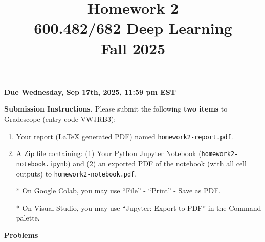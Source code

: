 \documentclass[a4paper]{article}
\title{Homework 2\\
600.482/682 Deep Learning\\
Fall 2025}
\date{}
\begin{document}
\maketitle
\vspace{-1.3cm}

\centerline{\textbf{Due Wednesday, Sep 17th, 2025, 11:59 pm EST}}
\vspace{0.2cm}

\noindent \textbf{Submission Instructions.} Please submit the following \textbf{two items} to Gradescope (entry code VWJRB3): 

\begin{enumerate}
    \item Your report (LaTeX generated PDF) named \texttt{homework2-report.pdf}.
    \item A Zip file containing: 
    (1) Your Python Jupyter Notebook (\texttt{homework2-notebook.ipynb}) and (2) an exported PDF of the notebook (with all cell outputs) to \texttt{homework2-notebook.pdf}.
    
    * On Google Colab, you may use ``File'' -\> ``Print'' -\> Save as PDF.
    
    * On Visual Studio, you may use ``Jupyter: Export to PDF'' in the Command palette.
\end{enumerate}


\vspace{5mm}

\noindent \textbf{Problems} 
\end{document}
